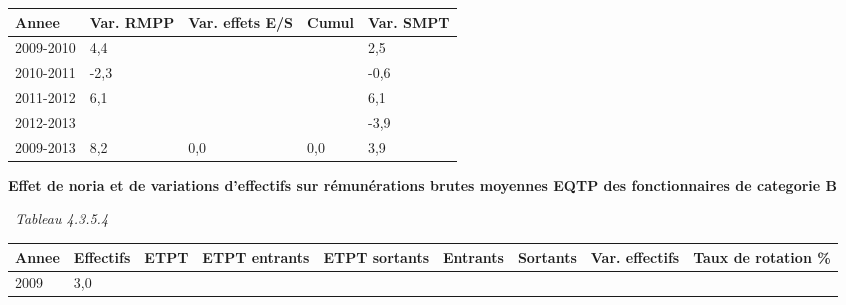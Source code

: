\begin{longtable}[]{@{}lllll@{}}
\toprule
Annee & Var. RMPP & Var. effets E/S & Cumul & Var. SMPT\tabularnewline
\midrule
\endhead
2009-2010 & 4,4 & & & 2,5\tabularnewline
2010-2011 & -2,3 & & & -0,6\tabularnewline
2011-2012 & 6,1 & & & 6,1\tabularnewline
2012-2013 & & & & -3,9\tabularnewline
2009-2013 & 8,2 & 0,0 & 0,0 & 3,9\tabularnewline
\bottomrule
\end{longtable}

\textbf{Effet de noria et de variations d'effectifs sur rémunérations
brutes moyennes EQTP des fonctionnaires de categorie B}

~\emph{Tableau 4.3.5.4}

\begin{longtable}[]{@{}lllllllll@{}}
\toprule
\begin{minipage}[b]{0.05\columnwidth}\raggedright
Annee\strut
\end{minipage} & \begin{minipage}[b]{0.08\columnwidth}\raggedright
Effectifs\strut
\end{minipage} & \begin{minipage}[b]{0.04\columnwidth}\raggedright
ETPT\strut
\end{minipage} & \begin{minipage}[b]{0.10\columnwidth}\raggedright
ETPT entrants\strut
\end{minipage} & \begin{minipage}[b]{0.10\columnwidth}\raggedright
ETPT sortants\strut
\end{minipage} & \begin{minipage}[b]{0.07\columnwidth}\raggedright
Entrants\strut
\end{minipage} & \begin{minipage}[b]{0.07\columnwidth}\raggedright
Sortants\strut
\end{minipage} & \begin{minipage}[b]{0.11\columnwidth}\raggedright
Var. effectifs\strut
\end{minipage} & \begin{minipage}[b]{0.14\columnwidth}\raggedright
Taux de rotation \%\strut
\end{minipage}\tabularnewline
\midrule
\endhead
\begin{minipage}[t]{0.05\columnwidth}\raggedright
2009\strut
\end{minipage} & \begin{minipage}[t]{0.08\columnwidth}\raggedright
3,0\strut
\end{minipage} & \begin{minipage}[t]{0.04\columnwidth}\raggedright

\end{minipage}
\end{longtable}
